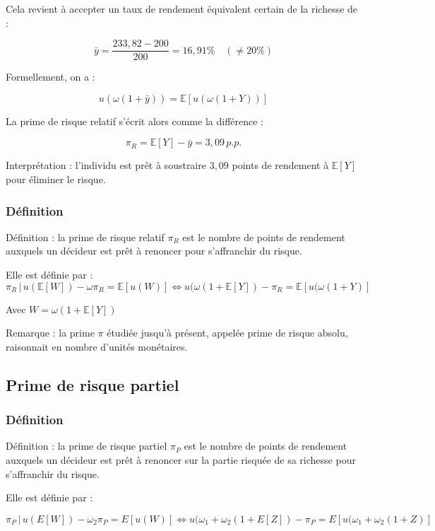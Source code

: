 \documentclass[a4paper, 12pt]{report}
\begin{document}
Cela revient à accepter un taux de rendement équivalent certain de la richesse de :

\[
\bar{y} = \frac{233,82 - 200}{200} = 16,91\% \quad (\neq 20\%)
\]

Formellement, on a :

\[
u(\omega (1 + \bar{y})) = \mathbb{E}\left[ u(\omega (1 + Y))\right]
\]

La prime de risque relatif s'écrit alors comme la différence :

\[
\pi_R = \mathbb{E}[Y] - \bar{y} = 3,09 \, p.p.
\]

Interprétation : l'individu est prêt à soustraire \( 3,09 \) points de rendement à \( \mathbb{E}[Y] \) pour éliminer le risque.

\subsubsection{Définition}

Définition : la prime de risque relatif \( \pi_R \) est le nombre de points de rendement auxquels un décideur est prêt à renoncer pour s'affranchir du risque.

Elle est définie par :
\[
\pi_R \, | \, u(\mathbb{E}[W]) - \omega \pi_R = \mathbb{E}[u(W)] \Leftrightarrow u(\omega(1 + \mathbb{E}[Y]) - \pi_R = \mathbb{E}[u(\omega(1 + Y)]
\]

Avec \( W = \omega\left( 1 + \mathbb{E}[Y]\right)  \)

Remarque : la prime \( \pi \) étudiée jusqu'à présent, appelée prime de risque absolu, raisonnait en nombre d'unités monétaires.

\subsection{Prime de risque partiel}

\subsubsection{Définition}

Définition : la prime de risque partiel \( \pi_P \) est le nombre de points de rendement auxquels un décideur est prêt à renoncer sur la partie risquée de sa richesse pour s'affranchir du risque.

Elle est définie par :

\[
\pi_P \, | \, u(E[W]) - \omega_2 \pi_P = E[u(W)] \Leftrightarrow u (\omega_1 + \omega_2(1 + E[Z]) - \pi_P = E[u(\omega_1 + \omega_2(1 + Z)]
\]
\end{document}
